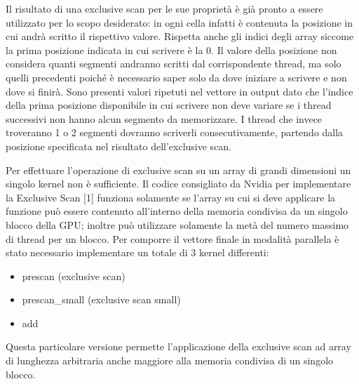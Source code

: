 \documentclass[12pt,a4paper]{report}
\begin{document}
\begin{figure}[H]
\centering
\begin{floatrow}[1]
\end{floatrow}
\end{figure} 
Il risultato di una exclusive scan per le sue proprietà è già pronto a essere utilizzato per lo scopo desiderato: in ogni cella infatti è contenuta la posizione in cui andrà scritto il rispettivo valore. Rispetta anche gli indici degli array siccome la prima posizione indicata in cui scrivere è la 0. Il valore della posizione non considera quanti segmenti andranno scritti dal corrispondente thread, ma solo quelli precedenti poiché è necessario saper solo da dove iniziare a scrivere e non dove si finirà. \newline
Sono presenti valori ripetuti nel vettore in output dato che l'indice della prima posizione disponibile in cui scrivere non deve variare se i thread successivi non hanno alcun segmento da memorizzare. I thread che invece troveranno 1 o 2 segmenti dovranno scriverli consecutivamente, partendo dalla posizione specificata nel risultato dell'exclusive scan. \newpage

Per effettuare l'operazione di exclusive scan su un array di grandi dimensioni un singolo kernel non è sufficiente.
Il codice consigliato da Nvidia per implementare la Exclusive Scan [1] funziona solamente se l’array su cui si deve applicare la funzione può essere contenuto all’interno della memoria condivisa da un singolo blocco della GPU; inoltre può utilizzare solamente la metà del numero massimo di thread per un blocco. \newline
Per comporre il vettore finale in modalità parallela è stato necessario implementare un totale di 3 kernel differenti:
\begin{itemize}
    \item prescan (exclusive scan)
    \item prescan\_small  (exclusive scan small)
    \item add
\end{itemize}
Questa particolare versione permette l'applicazione della exclusive scan ad array di lunghezza arbitraria anche maggiore alla memoria condivisa di un singolo blocco. \newline
\end{document}

